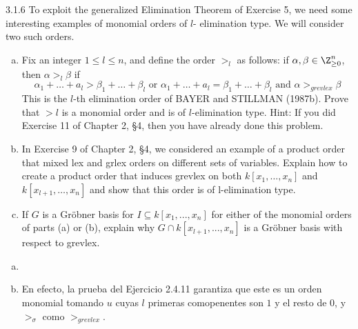 \documentclass[twoside]{article}
\begin{document}
\begin{ejercicio}{3.1.6}
To exploit the generalized Elimination Theorem of Exercise 5, we need some interesting examples of monomial orders of $l$-	elimination type. We will consider two such orders.
\begin{enumerate}[a.]
\item Fix an integer $1\leq l \leq n$, and define the order $>_l$ as follows: if $\alpha,\beta \in \Z_{\geq 0}^n$, then $\alpha>_l\beta$ if
$$
\alpha_1 + \dotsc + a_l > \beta_1 + \dotsc + \beta_l \text{ or } \alpha_1 + \dotsc + a_l = \beta_1 + \dotsc + \beta_l \text{ and } \alpha >_{grevlex} \beta
$$
This is the $l$-th elimination order of BAYER and STILLMAN (1987b). Prove that $>l$ is a monomial order and is of $l$-elimination type. Hint: If you did Exercise 11 of Chapter 2,
§4, then you have already done this problem.
\item In Exercise 9 of Chapter 2, §4, we considered an example of a product order that mixed lex and grlex orders on different sets of variables. Explain how to create a product order that induces grevlex on both $k[x_{1},\dotsc, x_n]$ and $k[x_{l+1},\dotsc, x_n]$ and show that this order
is of l-elimination type.
\item If $G$ is a Gröbner basis for $I ⊆ k[x_1, . . . , x_n]$ for either of the monomial orders of parts (a) or (b), explain why $G ∩ k[x_{l+1}, . . . , x_n]$ is a Gröbner basis with respect to grevlex.
\end{enumerate}
\end{ejercicio}
\begin{solucion}
\begin{enumerate}[a.]
\item[]
\item En efecto, la prueba del Ejercicio 2.4.11 garantiza que este es un orden monomial tomando $u$ cuyas $l$ primeras comopenentes son $1$ y el resto de $0$, y $>_\sigma$ como $>_{grevlex}$.
\end{enumerate}
\end{solucion}


\newpage
\end{document}

